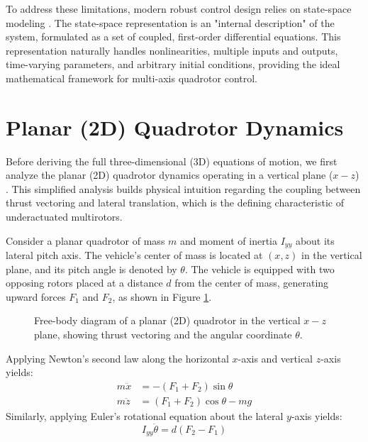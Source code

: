 To address these limitations, modern robust control design relies on state-space modeling \cite{ref_56, ref_61}. The state-space representation is an "internal description" of the system, formulated as a set of coupled, first-order differential equations. This representation naturally handles nonlinearities, multiple inputs and outputs, time-varying parameters, and arbitrary initial conditions, providing the ideal mathematical framework for multi-axis quadrotor control.

\section{Planar (2D) Quadrotor Dynamics}
Before deriving the full three-dimensional (3D) equations of motion, we first analyze the planar (2D) quadrotor dynamics operating in a vertical plane ($x-z$) \cite{ref_58}. This simplified analysis builds physical intuition regarding the coupling between thrust vectoring and lateral translation, which is the defining characteristic of underactuated multirotors.

Consider a planar quadrotor of mass $m$ and moment of inertia $I_{yy}$ about its lateral pitch axis. The vehicle's center of mass is located at $(x, z)$ in the vertical plane, and its pitch angle is denoted by $\theta$. The vehicle is equipped with two opposing rotors placed at a distance $d$ from the center of mass, generating upward forces $F_1$ and $F_2$, as shown in Figure \ref{fig:planar_quadrotor}.

\begin{figure}[h!]
\centering
{}
\caption{Free-body diagram of a planar (2D) quadrotor in the vertical $x-z$ plane, showing thrust vectoring and the angular coordinate $\theta$.}
\label{fig:planar_quadrotor}
\end{figure}

Applying Newton's second law along the horizontal $x$-axis and vertical $z$-axis yields:
\begin{align}
m\ddot{x} &= -(F_1 + F_2)\sin\theta \\
m\ddot{z} &= (F_1 + F_2)\cos\theta - mg
\end{align}
Similarly, applying Euler's rotational equation about the lateral $y$-axis yields:
\begin{equation}
I_{yy}\ddot{\theta} = d(F_2 - F_1)
\end{equation}


